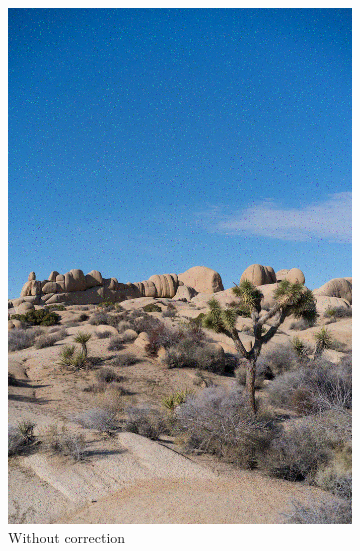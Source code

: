 \documentclass{article}
\begin{document}
\begin{figure}
\begin{subfigure}[b]{0.32\textwidth}
        \includegraphics[width=\textwidth]{../Result/hamming-bsc-output.png}
        \caption{Without correction}
        \label{fig:image-hamming-bsc-no-correction}
    \end{subfigure}
    \hfill
    \begin{subfigure}[b]{0.32\textwidth}
        \centering

\end{subfigure}
\end{figure}
\end{document}
